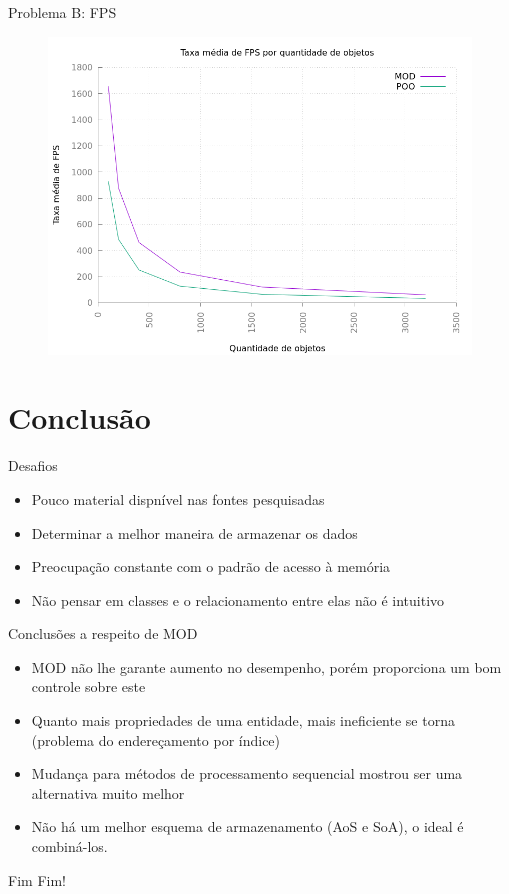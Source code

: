 \documentclass{beamer}
\begin{document}
\begin{frame}{Problema B: FPS}
    \begin{figure}[h!]
        \centering
        \includegraphics[width =.8\textwidth]{figuras/fpsv2}
        \par\medskip
    \end{figure}
\end{frame}

\section{Conclusão}

\frame{\tableofcontents[currentsection]}

\begin{frame}{Desafios}
    \begin{itemize}
        \item Pouco material dispnível nas fontes pesquisadas
        \item Determinar a melhor maneira de armazenar os dados
        \item Preocupação constante com o padrão de acesso à memória
        \item Não pensar em classes e o relacionamento entre elas 
            não é intuitivo
    \end{itemize}
\end{frame}

\begin{frame}{Conclusões a respeito de MOD}
    \begin{itemize}
        \item MOD não lhe garante aumento no desempenho, porém 
            proporciona um bom controle sobre este
        \item Quanto mais propriedades de uma entidade, mais 
            ineficiente se torna (problema do endereçamento por 
            índice)
        \item Mudança para métodos de processamento sequencial mostrou 
            ser uma alternativa muito melhor
        \item Não há um melhor esquema de armazenamento (AoS e SoA), 
            o ideal é combiná-los.
    \end{itemize}
\end{frame}

\begin{frame}{Fim}
    \centering
    \LARGE{Fim!}
\end{frame}
\end{document}
